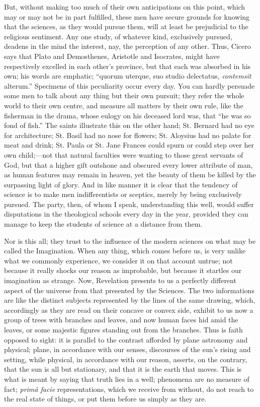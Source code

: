 But, without making too much of their own anticipations on this
point, which may or may not be in part fulfilled, these men have
secure grounds for knowing that the sciences, as they would pursue
them, will at least be prejudicial to the religious sentiment. Any one
study, of whatever kind, exclusively pursued, deadens in the mind the
interest, nay, the perception of any other. Thus, Cicero says that
Plato and Demosthenes, Aristotle and Isocrates, might have
respectively excelled in each other's province, but that each was
absorbed in his own; his words are emphatic; ``quorum uterque, suo
studio delectatus, \emph{contemsit} alterum.'' Specimens of this
peculiarity occur every day. You can hardly persuade some men to talk
about any thing but their own pursuit; they refer the whole world to
their own centre, and measure all matters by their own rule,
like the fisherman in the drama, whose eulogy on his deceased lord
was, that ``he was so fond of fish.'' The saints illustrate
this on the other hand; St. Bernard had no eye for architecture; St.
Basil had no nose for flowers; St. Aloysius had no palate for meat and
drink; St. Paula or St. Jane Frances could spurn or could step over
her own child;—not that natural faculties were wanting to those
great servants of God, but that a higher gift outshone and obscured
every lower attribute of man, as human features may remain in heaven,
yet the beauty of them be killed by the surpassing light of glory. And
in like manner it is clear that the tendency of science is to make men
indifferentists or sceptics, merely by being exclusively pursued. The
party, then, of whom I speak, understanding this well, would suffer
disputations in the theological schools every day in the year,
provided they can manage to keep the students of science at a distance
from them.

Nor is this all; they trust to the influence of the modern sciences
on what may be called the Imagination. When any thing, which comes
before us, is very unlike what we commonly experience, we consider it
on that account untrue; not because it really shocks our reason as
improbable, but because it startles our imagination as strange. Now,
Revelation presents to us a perfectly different aspect of the universe
from that presented by the Sciences. The two informations are like the
distinct subjects represented by the lines of the same drawing, which,
accordingly as they are read on their concave or convex side, exhibit
to us now a group of trees with branches and leaves, and now human
faces hid amid the leaves, or some majestic figures standing out from
the branches. Thus is faith opposed to sight: it is parallel to the
contrast afforded by plane astronomy and physical; plane, in
accordance with our senses, discourses of the sun's rising and
setting, while physical, in accordance with our reason, asserts, on
the contrary, that the sun is all but stationary, and that it is the
earth that moves. This is what is meant by saying that truth lies in a
well; phenomena are no measure of fact; \emph{primâ facie}
representations, which we receive from without, do not reach to the
real state of things, or put them before us simply as they are.

